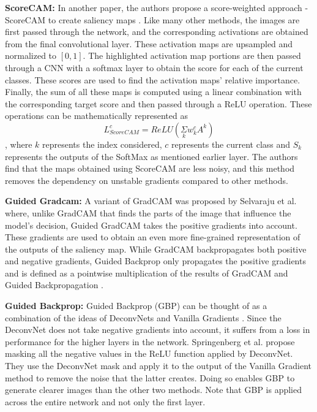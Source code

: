 \documentclass[a4paper,11pt,openright]{book}
\begin{document}
\textbf{ScoreCAM: }
In another paper, the authors propose a score-weighted approach - ScoreCAM to create saliency maps \cite{wangScoreCAMScoreWeightedVisual2020}. Like many other methods, the images are first passed through the network, and the corresponding activations are obtained from the final convolutional layer. These activation maps are upsampled and normalized to $[0,1]$. The highlighted activation map portions are then passed through a CNN with a softmax layer to obtain the score for each of the current classes. These scores are used to find the activation maps' relative importance. Finally, the sum of all these maps is computed using a linear combination with the corresponding target score and then passed through a ReLU operation. These operations can be mathematically represented as $$L^{c}_{ScoreCAM} = ReLU(\underset{k}\Sigma w_{k}^{c}A^{k})$$, where $k$ represents the index considered, $c$ represents the current class and $S_k$ represents the outputs of the SoftMax as mentioned earlier layer. The authors find that the maps obtained using ScoreCAM are less noisy, and this method removes the dependency on unstable gradients compared to other methods.

\textbf{Guided Gradcam: }
A variant of GradCAM \cite{selvarajuGradCAMVisualExplanations} was proposed by Selvaraju et al. \cite{selvarajuGradCAMWhyDid2017} where, unlike GradCAM that finds the parts of the image that influence the model's decision, Guided GradCAM takes the positive gradients into account. These gradients are used to obtain an even more fine-grained representation of the outputs of the saliency map. While GradCAM backpropagates both positive and negative gradients, Guided Backprop only propagates the positive gradients and is defined as a pointwise multiplication of the results of GradCAM and Guided Backpropagation \cite{springenbergStrivingSimplicityAll2015}.

\textbf{Guided Backprop: } Guided Backprop (GBP) \cite{springenbergStrivingSimplicityAll2015} can be thought of as a combination of the ideas of DeconvNets \cite{zeilerVisualizingUnderstandingConvolutional2013} and Vanilla Gradients \cite{simonyanDeepConvolutionalNetworks2014}. Since the DeconvNet does not take negative gradients into account, it suffers from a loss in performance for the higher layers in the network. Springenberg et al. propose masking all the negative values in the ReLU function applied by DeconvNet. They use the DeconvNet mask and apply it to the output of the Vanilla Gradient method to remove the noise that the latter creates. Doing so enables GBP to generate clearer images than the other two methods. Note that GBP is applied across the entire network and not only the first layer.
\end{document}
